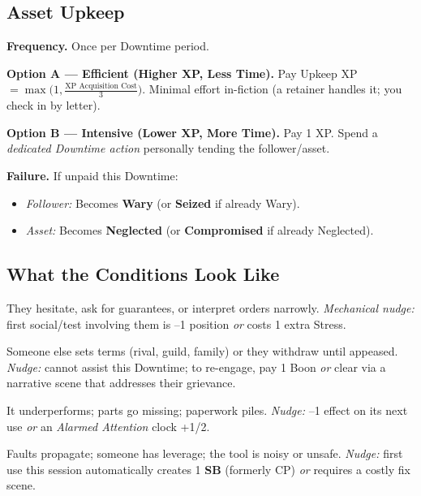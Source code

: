 \subsection{Asset Upkeep}\label{subsec:upkeep-core}
\textbf{Frequency.} Once per Downtime period.\par
\textbf{Option A — Efficient (Higher XP, Less Time).} Pay Upkeep XP $= \max\big(1, \tfrac{\text{XP Acquisition Cost}}{3}\big)$. Minimal effort in-fiction (a retainer handles it; you check in by letter).\par
\textbf{Option B — Intensive (Lower XP, More Time).} Pay 1 XP. Spend a \emph{dedicated Downtime action} personally tending the follower/asset.

\textbf{Failure.} If unpaid this Downtime:
\begin{itemize}
\item \emph{Follower:} Becomes \textbf{Wary} (or \textbf{Seized} if already Wary).
\item \emph{Asset:} Becomes \textbf{Neglected} (or \textbf{Compromised} if already Neglected).
\end{itemize}

\subsection{What the Conditions Look Like}\label{subsec:upkeep-conditions}
\begin{description}[leftmargin=1.6em]
\item[\textsc{Wary} (Follower).] They hesitate, ask for guarantees, or interpret orders narrowly. \emph{Mechanical nudge:} first social/test involving them is –1 position \emph{or} costs 1 extra Stress.
\item[\textsc{Seized} (Follower).] Someone else sets terms (rival, guild, family) or they withdraw until appeased. \emph{Nudge:} cannot assist this Downtime; to re-engage, pay 1 Boon \emph{or} clear via a narrative scene that addresses their grievance.
\item[\textsc{Neglected} (Asset).] It underperforms; parts go missing; paperwork piles. \emph{Nudge:} –1 effect on its next use \emph{or} an \emph{Alarmed Attention} clock +1/2.
\item[\textsc{Compromised} (Asset).] Faults propagate; someone has leverage; the tool is noisy or unsafe. \emph{Nudge:} first use this session automatically creates 1 \textbf{SB} (formerly CP) \emph{or} requires a costly fix scene.
\end{description}


